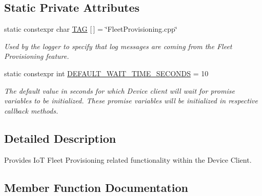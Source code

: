 \subsection*{Static Private Attributes}
\begin{DoxyCompactItemize}
\item 
\mbox{\label{class_aws_1_1_iot_1_1_device_client_1_1_fleet_provisioning_adfa918ea7ce640a53fb08cd13740cfb3}} 
static constexpr char \hyperlink{class_aws_1_1_iot_1_1_device_client_1_1_fleet_provisioning_adfa918ea7ce640a53fb08cd13740cfb3}{T\+AG} \mbox{[}$\,$\mbox{]} = \char`\"{}Fleet\+Provisioning.\+cpp\char`\"{}
\begin{DoxyCompactList}\small\item\em Used by the logger to specify that log messages are coming from the Fleet Provisioning feature. \end{DoxyCompactList}\item 
\mbox{\label{class_aws_1_1_iot_1_1_device_client_1_1_fleet_provisioning_aced71437e7c96da26a13e53288ca1247}} 
static constexpr int \hyperlink{class_aws_1_1_iot_1_1_device_client_1_1_fleet_provisioning_aced71437e7c96da26a13e53288ca1247}{D\+E\+F\+A\+U\+L\+T\+\_\+\+W\+A\+I\+T\+\_\+\+T\+I\+M\+E\+\_\+\+S\+E\+C\+O\+N\+DS} = 10
\begin{DoxyCompactList}\small\item\em The default value in seconds for which Device client will wait for promise variables to be initialized. These promise variables will be initialized in respective callback methods. \end{DoxyCompactList}\end{DoxyCompactItemize}


\subsection{Detailed Description}
Provides IoT Fleet Provisioning related functionality within the Device Client. 

\subsection{Member Function Documentation}
\mbox{\label{class_aws_1_1_iot_1_1_device_client_1_1_fleet_provisioning_a9be44fae9cf49f534763243561c66586}} 
